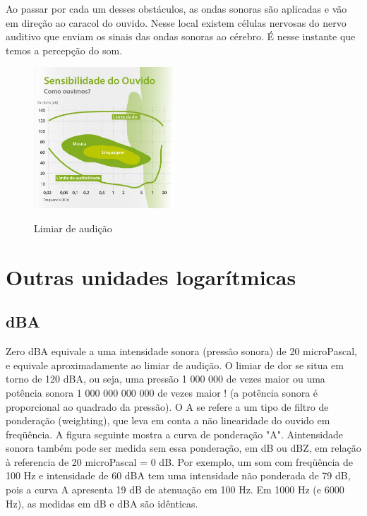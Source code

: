\documentclass[
	article,			%
	11pt,				%
	oneside,			%
	a4paper,			%
	english,			%
	brazil,				%
	sumario=tradicional
	]{abntex2}
\begin{document}
Ao passar por cada um desses obstáculos, as ondas sonoras são aplicadas e vão em direção ao caracol do ouvido. Nesse local existem células nervosas do nervo auditivo que enviam os sinais das ondas sonoras ao cérebro. É nesse instante que temos a percepção do som.
\begin{figure}[h]
\caption{Limiar de audição}
\centering
\includegraphics[width=200]{Limiar de audição.jpg}
\label{Limiar de audição}
\end{figure}

\section{Outras unidades logarítmicas}
\subsection{dBA}
Zero dBA equivale a uma intensidade sonora (pressão sonora) de
20 microPascal, e equivale aproximadamente ao limiar de audição. O limiar de
dor se situa em torno de 120 dBA, ou seja, uma pressão 1 000 000 de vezes
maior ou uma potência sonora 1 000 000 000 000 de vezes maior ! (a potência
sonora é proporcional ao quadrado da pressão). O A se refere a um tipo de
filtro de ponderação (weighting), que leva em conta a não linearidade do ouvido
em freqüência. A figura seguinte mostra a curva de ponderação "A". 
Aintensidade sonora também pode ser medida sem essa ponderação, em dB ou
dBZ, em relação à referencia de 20 microPascal = 0 dB. Por exemplo, um som
com freqüência de 100 Hz e intensidade de 60 dBA tem uma intensidade não
ponderada de 79 dB, pois a curva A apresenta 19 dB de atenuação em 100 Hz.
Em 1000 Hz (e 6000 Hz), as medidas em dB e dBA são idênticas.
\end{document}
